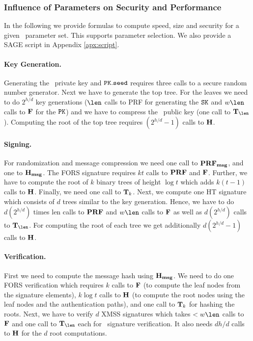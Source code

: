 \subsubsection{Influence of Parameters on Security and Performance} \label{sec:securityandperformance}

In the following we provide formulas to compute speed, size and security for a given \SPHINCSA\ parameter set. This supports parameter selection. We also provide a SAGE script in Appendix \ref{apx:script}.
 

\paragraph{Key Generation.} 
Generating the \SPHINCSA\ private key and $\pk.\seed$ requires three calls to a secure random number generator. Next we have to generate the top tree. For the leaves we need to do $2^{h/d}$ \WOTSCS key generations ($\len$ calls to PRF for generating the $\sk$ and $w \len$ calls to $\mathbf{F}$ for the $\pk$) and we have to compress the \WOTSCS\ public key (one call to $\Th_{\len}$). Computing the root of the top tree requires $(2^{h/d}-1)$ calls to $\mathbf{H}$.

\paragraph{Signing.}
For randomization and message compression we need one call to $\mathbf{PRF_{msg}}$, and one to $\mathbf{H_{msg}}$. The FORS signature requires $kt$ calls to $\mathbf{PRF}$ and $\mathbf{F}$. Further, we have to compute the root of $k$ binary trees of height $\log t$ which adds $k(t-1)$ calls to $\mathbf{H}$. Finally, we need one call to $\mathbf{T}_{k}$. Next, we compute one HT signature which consists of $d$ trees similar to the key generation. Hence, we have to do $d(2^{h/d})$ times len calls to $\mathbf{PRF}$ and $w \len$ calls to $\mathbf{F}$ as well as $d(2^{h/d})$ calls to $\Th_{\len}$. For computing the root of each tree we get additionally $d(2^{h/d}-1)$ calls to $\mathbf{H}$.

\paragraph{Verification.}
First we need to compute the message hash using $\mathbf{H_{msg}}$. We need to do one FORS verification which requires $k$ calls to $\mathbf{F}$ (to compute the leaf nodes from the signature elements), $k\log t$ calls to $\mathbf{H}$ (to compute the root nodes using the leaf nodes and the authentication paths), and one call to $\mathbf{T}_{k}$ for hashing the roots. Next, we have to verify $d$ XMSS signatures which takes $< w \len$ calls to $\mathbf{F}$ and one call to $\Th_{\len}$ each for \WOTSCS\ signature verification\footnotemark. It also needs $dh/d$ calls to $\mathbf{H}$ for the $d$ root computations.

